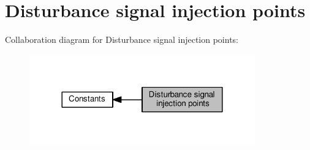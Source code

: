 \hypertarget{group__IL__CONST__DSIG__INJ}{}\section{Disturbance signal injection points}
\label{group__IL__CONST__DSIG__INJ}
Collaboration diagram for Disturbance signal injection points\+:\nopagebreak
\begin{figure}[H]
\begin{center}
\leavevmode
\includegraphics[width=276pt]{group__IL__CONST__DSIG__INJ}
\end{center}
\end{figure}
